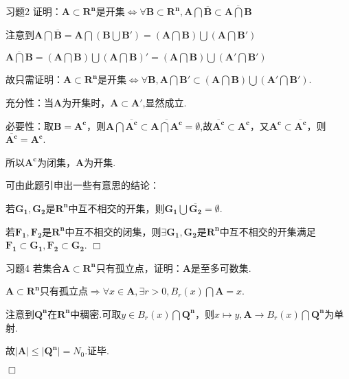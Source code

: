\documentclass[11pt, a4paper, twoside]{ctexbook}
\newenvironment{proof2}{{\noindent\heiti 证明}}{\hfill $\Box $\par}
\begin{document}
    \begin{myproposition}{习题2}{}
        证明：$\mathbf{A} \subset \mathbf{R^{n}}$是开集$\Leftrightarrow \forall \mathbf{B}\subset \mathbf{R^{n}},\mathbf{A}\bigcap \overline{\mathbf{B}}\subset \overline{\mathbf{A}\bigcap \mathbf{B}}$
    \end{myproposition}
    \begin{proof2}
        注意到$\mathbf{A}\bigcap \overline{\mathbf{B}}=\mathbf{A}\bigcap(\mathbf{B}\bigcup\mathbf{B'})=(\mathbf{A}\bigcap\mathbf{B})\bigcup (\mathbf{A}\bigcap\mathbf{B'})$


        $\overline{\mathbf{A}\bigcap \mathbf{B}}=(\mathbf{A}\bigcap \mathbf{B})\bigcup (\mathbf{A}\bigcap \mathbf{B})'=(\mathbf{A}\bigcap \mathbf{B})\bigcup (\mathbf{A'}\bigcap \mathbf{B'})$


        故只需证明：$\mathbf{A} \subset \mathbf{R^{n}}$是开集$\Leftrightarrow \forall \mathbf{B}, \mathbf{A}\bigcap\mathbf{B'} \subset (\mathbf{A}\bigcap \mathbf{B})\bigcup (\mathbf{A'}\bigcap \mathbf{B'})$.


        充分性：当$\mathbf{A}$为开集时，$\mathbf{A} \subset \mathbf{A'}$,显然成立.


        必要性：取$\mathbf{B}=\mathbf{A^{c}}$，则$\mathbf{A}\bigcap \overline{\mathbf{A^{c}}}\subset \overline{\mathbf{A}\bigcap \mathbf{A^{c}}}=\emptyset$,故$\overline{\mathbf{A^{c}}}\subset \mathbf{A^{c}}$，又$\mathbf{A^{c}\subset\overline{\mathbf{A^{c}}} }$，则$\overline{\mathbf{A^{c}}}=\mathbf{A^{c}}$.


        所以$\mathbf{A^{c}}$为闭集，$\mathbf{A}$为开集. 

		可由此题引申出一些有意思的结论：


        若$\mathbf{G_{1}},\mathbf{G_{2}}$是$\mathbf{R^{n}}$中互不相交的开集，则$\mathbf{G_{1}}\bigcup \overline{\mathbf{G_{2}}}=\emptyset.$

        若$\mathbf{F_{1}},\mathbf{F_{2}}$是$\mathbf{R^{n}}$中互不相交的闭集，则$\exists \mathbf{G_{1}},\mathbf{G_{2}}$是$\mathbf{R^{n}}$中互不相交的开集满足
        $\mathbf{F_{1}\subset \mathbf{G_{1}}},\mathbf{F_{2}\subset \mathbf{G_{2}}}$.
    \end{proof2}


    \begin{myproposition}{习题4}{}
        若集合$\mathbf{A}\subset \mathbf{R^{n}}$只有孤立点，证明：$\mathbf{A}$是至多可数集.
    \end{myproposition}
    \begin{proof2}
        $\mathbf{A}\subset \mathbf{R^{n}}$只有孤立点$\Rightarrow \forall x \in \mathbf{A},\exists r>0,B_{r}(x)\bigcap\mathbf{A}={x}$.


        注意到$\mathbf{Q^{n}}$在$\mathbf{R^{n}}$中稠密.可取$y\in B_{r}(x)\bigcap\mathbf{Q^{n}}$，则$x\mapsto y,\mathbf{A} \to B_{r}(x)\bigcap\mathbf{Q^{n}}$为单射.


        故$\mid \mathbf{A}\mid \leq \mid\mathbf{Q^{n}} \mid =N_{0}$.证毕.



    \end{proof2}
\end{document}
